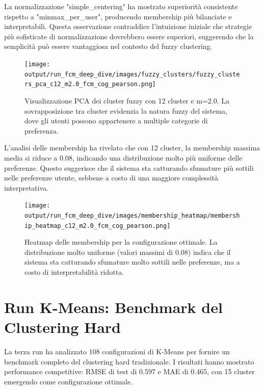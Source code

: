 La normalizzazione "simple\_centering" ha mostrato superiorità consistente rispetto a "minmax\_per\_user", producendo membership più bilanciate e interpretabili. Questa osservazione contraddice l'intuizione iniziale che strategie più sofisticate di normalizzazione dovrebbero essere superiori, suggerendo che la semplicità può essere vantaggiosa nel contesto del fuzzy clustering.

\begin{figure}[h]
\centering
\texttt{[image: output/run\_fcm\_deep\_dive/images/fuzzy\_clusters/fuzzy\_clusters\_pca\_c12\_m2.0\_fcm\_cog\_pearson.png]}
\caption{Visualizzazione PCA dei cluster fuzzy con 12 cluster e m=2.0. La sovrapposizione tra cluster evidenzia la natura fuzzy del sistema, dove gli utenti possono appartenere a multiple categorie di preferenza.}
\label{fig:fcm_clusters_pca}
\end{figure}

L'analisi delle membership ha rivelato che con 12 cluster, la membership massima media si riduce a 0.08, indicando una distribuzione molto più uniforme delle preferenze. Questo suggerisce che il sistema sta catturando sfumature più sottili nelle preferenze utente, sebbene a costo di una maggiore complessità interpretativa.

\begin{figure}[h]
\centering
\texttt{[image: output/run\_fcm\_deep\_dive/images/membership\_heatmap/membership\_heatmap\_c12\_m2.0\_fcm\_cog\_pearson.png]}
\caption{Heatmap delle membership per la configurazione ottimale. La distribuzione molto uniforme (valori massimi di 0.08) indica che il sistema sta catturando sfumature molto sottili nelle preferenze, ma a costo di interpretabilità ridotta.}
\label{fig:fcm_membership_heatmap}
\end{figure}

\section{Run K-Means: Benchmark del Clustering Hard}

La terza run ha analizzato 108 configurazioni di K-Means per fornire un benchmark completo del clustering hard tradizionale. I risultati hanno mostrato performance competitive: RMSE di test di 0.597 e MAE di 0.465, con 15 cluster emergendo come configurazione ottimale.

